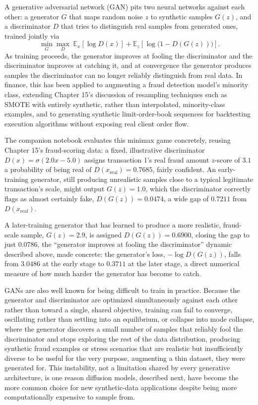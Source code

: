 \documentclass[../ai_in_finance]{subfiles}
\begin{document}
A generative adversarial network (GAN) pits two neural networks against each other: a generator $G$ that maps random noise $z$ to synthetic samples $G(z)$, and a discriminator $D$ that tries to distinguish real samples from generated ones, trained jointly via
\begin{equation*}
\min_G \max_D \; \mathbb{E}_{x}\!\left[\log D(x)\right] + \mathbb{E}_{z}\!\left[\log\big(1 - D(G(z))\big)\right].
\end{equation*}
As training proceeds, the generator improves at fooling the discriminator and the discriminator improves at catching it, and at convergence the generator produces samples the discriminator can no longer reliably distinguish from real data. In finance, this has been applied to augmenting a fraud detection model's minority class, extending Chapter 15's discussion of resampling techniques such as SMOTE with entirely synthetic, rather than interpolated, minority-class examples, and to generating synthetic limit-order-book sequences for backtesting execution algorithms without exposing real client order flow.

The companion notebook evaluates this minimax game concretely, reusing Chapter 15's fraud-scoring data: a fixed, illustrative discriminator $D(x) = \sigma(2.0x - 5.0)$ assigns transaction 1's real fraud amount $z$-score of $3.1$ a probability of being real of $D(x_{\text{real}}) = 0.7685$, fairly confident. An early-training generator, still producing unrealistic samples close to a typical legitimate transaction's scale, might output $G(z) = 1.0$, which the discriminator correctly flags as almost certainly fake, $D(G(z)) = 0.0474$, a wide gap of $0.7211$ from $D(x_{\text{real}})$.

A later-training generator that has learned to produce a more realistic, fraud-scale sample, $G(z) = 2.9$, is assigned $D(G(z)) = 0.6900$, closing the gap to just $0.0786$, the ``generator improves at fooling the discriminator'' dynamic described above, made concrete: the generator's loss, $-\log D(G(z))$, falls from $3.0486$ at the early stage to $0.3711$ at the later stage, a direct numerical measure of how much harder the generator has become to catch.

GANs are also well known for being difficult to train in practice. Because the generator and discriminator are optimized simultaneously against each other rather than toward a single, shared objective, training can fail to converge, oscillating rather than settling into an equilibrium, or collapse into mode collapse, where the generator discovers a small number of samples that reliably fool the discriminator and stops exploring the rest of the data distribution, producing synthetic fraud examples or stress scenarios that are realistic but insufficiently diverse to be useful for the very purpose, augmenting a thin dataset, they were generated for. This instability, not a limitation shared by every generative architecture, is one reason diffusion models, described next, have become the more common choice for new synthetic-data applications despite being more computationally expensive to sample from.
\end{document}
